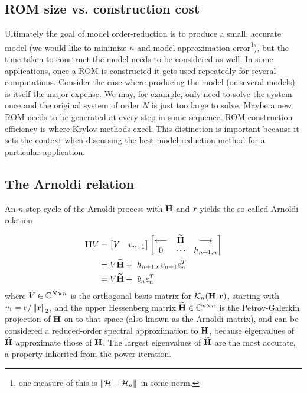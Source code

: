 \subsection{ROM size vs. construction cost}
Ultimately the goal of model order-reduction is to produce a small, accurate model (we would like to minimize $n$ and model approximation error\footnote{one measure of this is $\left\| \mathcal{H} -\mathcal{H}_n \right\|_{}$ in some norm.}), but the time taken to construct the model needs to be considered as well.  In some applications, once a ROM is constructed it gets used repeatedly for several computations.  Consider the case where producing the model (or several models) is itself the major expense.  We may, for example, only need to solve the system once and the original system of order $N$ is just too large to solve.  Maybe a new ROM needs to be generated at every step in some sequence.   ROM construction efficiency is where Krylov methods excel.   This distinction is important because it sets the context when discussing the best model reduction method for a particular application. 

 
\subsection{The Arnoldi relation}
   An $n$-step cycle of the Arnoldi process with $\textbf{\textup{H}}$ and $\textbf{\textup{r}}$ yields the so-called Arnoldi relation
   
\begin{equation}     
  \begin{aligned}
           \textbf{\textup{H}} V &= \begin{bmatrix} V& v_{n+1}\end{bmatrix} \begin{bmatrix} \longleftarrow&\widetilde{\textbf{\textup{H}}}& \longrightarrow\\ 0 &\cdots & h_{n+1,n} \end{bmatrix}  \\
			  &= V\widetilde{\textbf{\textup{H}}} +\ h_{n+1,n} v_{n+1} e_n^{T}\\
			&= V\widetilde{\textbf{\textup{H}}} +\ \hat{v}_n e_n^{T}
   \end{aligned}
 \label{eq:arnoldi_relation}
\end{equation}
   where $V\in\mathbb{C}^{N\times n}$ is the orthogonal basis matrix for 
   $\mathcal{K}_{n}({\textbf{\textup{H}}},{\textbf{\textup{r}}})$, starting with $v_1 = \textbf{\textup{r}}/\left\| \textbf{\textup{r}} \right\|_{2}$, and the upper Hessenberg matrix 
   $\widetilde{\textbf{\textup{H}}}\in\mathbb{C}^{n\times n}$ 
   is the Petrov-Galerkin projection of $\textbf{\textup{H}}$ on to that space (also known as the Arnoldi matrix), and can be considered a reduced-order spectral approximation to $\textbf{\textup{H}}$, because eigenvalues of $\widetilde{\textbf{\textup{H}}}$ approximate those of $\textbf{\textup{H}}$.    The largest eigenvalues of $\widetilde{\textbf{\textup{H}}}$ are the most accurate, a property inherited from the power iteration.

